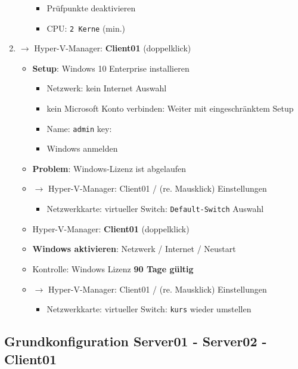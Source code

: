 \begin{enumerate}
\begin{itemize}
    \begin{itemize}
    \item
      Prüfpunkte deaktivieren
    \item
      CPU: \verb|2 Kerne| (min.)
    \end{itemize}
  \end{itemize}
\item
  $\to$ Hyper-V-Manager: \textbf{Client01} (doppelklick)

  \begin{itemize}
  \item
    \textbf{Setup}: Windows 10 Enterprise installieren

    \begin{itemize}
    \item
      Netzwerk: kein Internet Auswahl
    \item
      kein Microsoft Konto verbinden: Weiter mit eingeschränktem Setup
    \item
      Name: \verb|admin| key:
    \item
      Windows anmelden
    \end{itemize}
  \item
    \textbf{Problem}: Windows-Lizenz ist abgelaufen
  \item
    $\to$ Hyper-V-Manager: Client01 / (re. Mausklick) Einstellungen

    \begin{itemize}
    \item
      Netzwerkkarte: virtueller Switch:
      \verb|Default-Switch| Auswahl
    \end{itemize}
  \item
    Hyper-V-Manager: \textbf{Client01} (doppelklick)
  \item
    \textbf{Windows aktivieren}: Netzwerk / Internet / Neustart
  \item
    Kontrolle: Windows Lizenz \textbf{90 Tage gültig}
  \item
    $\to$ Hyper-V-Manager: Client01 / (re. Mausklick) Einstellungen

    \begin{itemize}
    \item
      Netzwerkkarte: virtueller Switch: \verb|kurs|
      wieder umstellen
    \end{itemize}
  \end{itemize}
\end{enumerate}

\subsection{Grundkonfiguration Server01 - Server02 -
Client01}\label{grundkonfiguration-server01-server02-client01}

